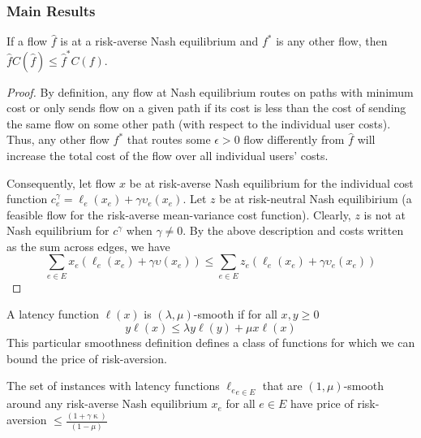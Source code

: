 \subsubsection{Main Results}
\begin{theorem}
    If a flow $\hat{f}$ is at a risk-averse Nash equilibrium and $f^*$ is any other flow, then $\hat{f}C(\hat{f})\leq \hat{f}^*C(f)$. 
    \label{variational}
\end{theorem}

\begin{proof}
    By definition, any flow at Nash equilibrium routes on paths with minimum cost or only sends flow on a given path if its cost is less than
    the cost of sending the same flow on some other path (with respect to the individual user costs). 
    Thus, any other flow $f^*$ that routes some $\epsilon > 0$ flow differently from $\hat{f}$ will increase the total cost of the flow over all individual users' costs.

    Consequently, let flow $x$ be at risk-averse Nash equilibrium for the individual cost function $c^\gamma_e = \ell_e(x_e) +\gamma \upsilon_e(x_e)$. Let $z$ be at risk-neutral Nash equilibirium (a feasible flow for the risk-averse mean-variance cost function). 
    Clearly, $z$ is not at Nash equilibrium for $c^\gamma$ when $\gamma \neq 0$. 
    By the above description and costs written as the sum across edges, we have
    $$\sum_{e \in E}x_e(\ell_e(x_e) + \gamma \upsilon(x_e)) \leq \sum_{e \in E} z_e(\ell_e(x_e) + \gamma \upsilon_e(x_e))$$
\end{proof}

\begin{definition}
    A latency function $\ell(x)$ is $(\lambda, \mu)$-smooth if for all $x, y \geq 0$ $$ y\ell(x) \leq \lambda y\ell(y) + \mu x \ell(x)$$
    This particular smoothness definition defines a class of functions for which we can bound the price of risk-aversion.
\end{definition}

\begin{theorem}
    The set of instances with latency functions ${\ell_e}_{e \in E}$ that are $(1,\mu)$-smooth around any risk-averse Nash equilibrium $x_e$ for all $e \in E$ have price of risk-aversion
    $\leq \displaystyle \frac{(1 + \gamma \upkappa)}{(1 - \mu)}$
\end{theorem}

